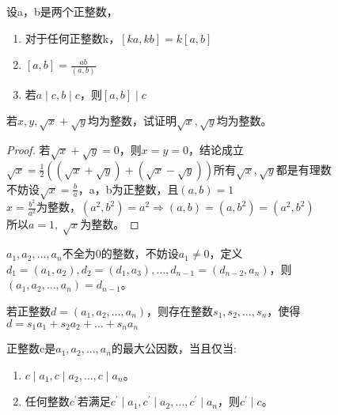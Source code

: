 \documentclass[cn,10pt]{elegantbook}
\begin{document}
\begin{theorem}
  设a，b是两个正整数，
  \begin{enumerate}[(1)]
    \item 对于任何正整数k，$[ka,kb] = k [a,b]$
    \item $[a,b]= \frac{ab}{(a,b)}$
    \item 若$a \mid c, b \mid c$，则$[a,b] \mid c$
  \end{enumerate}
\end{theorem}

\begin{example}
  若$x,y, \sqrt{x} + \sqrt{y} $均为整数，试证明$\sqrt{x} , \sqrt{y}$均为整数。
\end{example}

\begin{proof}
  若$\sqrt{x}+\sqrt{y}=0$，则$x=y=0$，结论成立\\
  $\sqrt{x} = \frac{1}{2} ((\sqrt{x}+\sqrt{y})+(\sqrt{x}-\sqrt{y}))$所有$\sqrt{x},\sqrt{y}$都是有理数\\
  不妨设$\sqrt{x}=\frac{b}{a}$，a，b为正整数，且$(a,b)=1$\\
  $x =  \frac{b^2}{a^2}$为整数，$(a^2,b^2)=a^2 \Rightarrow (a,b)=(a,b^2) = (a^2,b^2)$\\
  所以$a= 1,\  \sqrt{x}$为整数。
\end{proof}

\begin{theorem}
  $a_1,a_2,\dots,a_n $不全为$0$的整数，不妨设$a_1 \neq 0$，定义$d_1 = (a_1,a_2),d_2=(d_1,a_3),\dots ,d_{n-1}=(d_{n-2},a_n)$，则$(a_1,a_2,\dots,a_n) = d_{n-1}$。
\end{theorem}

\begin{conclusion}
  若正整数$d = (a_1,a_2,\dots,a_n)$，则存在整数$s_1,s_2,\dots,s_n$，使得$d=s_1a_1+s_2a_2+\dots +s_na_n$
\end{conclusion}

\begin{theorem}
  正整数c是$a_1,a_2,\dots,a_n$的最大公因数，当且仅当:
  \begin{enumerate}[(1)]
    \item $c \mid a_1, c \mid a_2, \dots ,c \mid a_n$。
    \item 任何整数$c^{\prime}$若满足$c^{\prime} \mid a_1,c^{\prime} \mid a_2, \dots , c^{\prime} \mid a_n$，则$c^{\prime} \mid c$。
  \end{enumerate}
\end{theorem}
\end{document}
